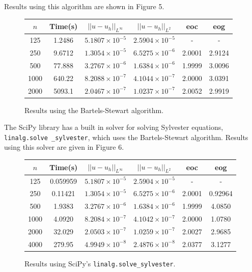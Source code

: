 \documentclass{article}
\numberwithin{equation}{section}
\begin{document}
Results using this algorithm are shown in Figure 5.

\begin{figure}[H]
\centering
\begin{tabular}{|c|c|c|c|c|c|}
\hline
$n$ & Time(s) & $|| u - u_h ||_{L^{\infty}}$ &$|| u - u_h ||_{L^{2}}$ & eoc & eog \\
\hline
125 & 1.2486 & $5.1807 \times 10^{-5}$ & $2.5904 \times 10^{-5}$ & - & - \\
250 & 9.6712 & $1.3054 \times 10^{-5}$ & $6.5275 \times 10^{-6}$ & 2.0001 & 2.9124 \\
500 & 77.888 & $3.2767 \times 10^{-6}$ & $1.6384 \times 10^{-6}$ & 1.9999 & 3.0096 \\ 
1000 & 640.22 & $8.2088 \times 10^{-7}$ & $4.1044 \times 10^{-7}$ & 2.0000 & 3.0391 \\
2000 & 5093.1 & $2.0467 \times 10^{-7}$ & $1.0237 \times 10^{-7}$ & 2.0052 & 2.9919 \\
\hline
\end{tabular}
\caption{Results using the Bartels-Stewart algorithm.}
\end{figure}

The SciPy library has a built in solver for solving Sylvester equations, \texttt{linalg.solve \_sylvester}, which uses the Bartels-Stewart algorithm. Results using this solver are given in Figure 6.

\begin{figure}[H]
\centering
\begin{tabular}{|c|c|c|c|c|c|}
\hline
$n$ & Time(s) & $|| u - u_h ||_{L^{\infty}}$ &$|| u - u_h ||_{L^{2}}$ & eoc & eog \\
\hline
125 & 0.059959 & $5.1807 \times 10^{-5}$ & $2.5904 \times 10^{-5}$ & - & - \\
250 & 0.11421 & $1.3054 \times 10^{-5}$ & $6.5275 \times 10^{-6}$ & 2.0001 & 0.92964 \\
500 & 1.9383 & $3.2767 \times 10^{-6}$ & $1.6384 \times 10^{-6}$ & 1.9999 & 4.0850  \\
1000 & 4.0920 & $8.2084 \times 10^{-7}$ & $4.1042 \times 10^{-7}$ & 2.0000 & 1.0780 \\
2000 & 32.029 & $2.0503 \times 10^{-7}$ & $1.0259 \times 10^{-7}$ & 2.0027 & 2.9685  \\
4000 & 279.95 & $4.9949 \times 10^{-8}$ & $2.4876 \times 10^{-8}$ & 2.0377 & 3.1277  \\
\hline
\end{tabular}
\caption{Results using SciPy's \texttt{linalg.solve\_sylvester}.}
\end{figure}
\end{document}
